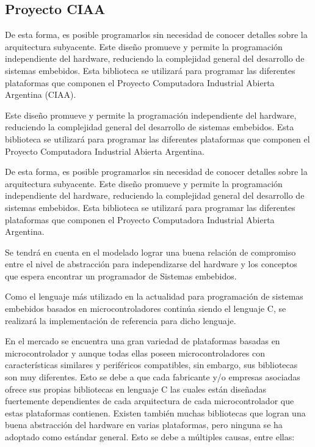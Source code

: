 \subsection{Proyecto CIAA}

De esta forma, es posible programarlos sin necesidad de conocer detalles sobre
la arquitectura subyacente. Este diseño promueve y permite la programación 
independiente del hardware, reduciendo la complejidad general del desarrollo de
sistemas embebidos. Esta biblioteca se utilizará para programar las diferentes
plataformas que componen el Proyecto Computadora Industrial Abierta Argentina 
(CIAA).



Este diseño promueve y permite la programación independiente del hardware, reduciendo la complejidad general del desarrollo de sistemas embebidos. Esta biblioteca se utilizará para programar las diferentes plataformas que componen el Proyecto Computadora Industrial Abierta Argentina.





De esta forma, es posible programarlos sin necesidad de conocer detalles sobre la arquitectura subyacente. Este diseño promueve y permite la programación independiente del hardware, reduciendo la complejidad general del desarrollo de sistemas embebidos. Esta biblioteca se utilizará para programar las diferentes plataformas que componen el Proyecto Computadora Industrial Abierta Argentina.


 



Se tendrá en cuenta en el modelado lograr una buena relación de compromiso entre el nivel de abstracción para independizarse del hardware y los conceptos que espera encontrar un programador de Sistemas embebidos.



Como el lenguaje más utilizado en la actualidad para programación de sistemas embebidos basados en microcontroladores continúa siendo el lenguaje C, se realizará la implementación de referencia para dicho lenguaje.




En el mercado se encuentra una gran variedad de plataformas basadas en microcontrolador y aunque todas ellas poseen microcontroladores con características similares y periféricos compatibles, sin embargo, sus bibliotecas son muy diferentes. Esto se debe a que cada fabricante y/o empresas asociadas ofrece sus propias bibliotecas en lenguaje C las cuales están diseñadas fuertemente dependientes de cada arquitectura de cada microcontrolador que estas plataformas contienen.
Existen también muchas bibliotecas que logran una buena abstracción del hardware en varias plataformas, pero ninguna se ha adoptado como estándar general. Esto se debe a múltiples causas, entre ellas:


